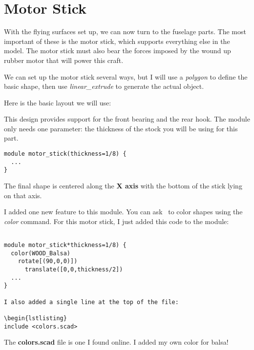 \section*{Motor Stick}

With the flying surfaces set up, we can now turn to the fuselage parts. The
most important of these is the motor stick, which supports everything else in
the model. The motor stick must also bear the forces imposed by the wound up
rubber motor that will power this craft.

We can set up the motor stick several ways, but I will use a {\it polygon} to
define the basic shape, then use {\it linear\_extrude} to generate the actual
object.

Here is the basic layout we will use:


This design provides support for the front bearing and the rear hook. The
module only needs one parameter: the thickness of the stock you will be using
for this part.

\begin{lstlisting}
module motor_stick(thickness=1/8) {
  ...
}
\end{lstlisting}

The final shape is centered along the {\bf X axis} with the bottom of the stick
lying on that axis.


I added one new feature to this module. You can ask \osc\ to color shapes using
the {\it color} command. For this motor stick, I just added this code to the
module:

\begin{lstlisting}

module motor_stick*thickness=1/8) {
  color(WOOD_Balsa)
    rotate[(90,0,0)])
      translate([0,0,thickness/2])
  ...
}

I also added a single line at the top of the file:

\begin{lstlisting}
include <colors.scad>
\end{lstlisting}

The {\bf colors.scad} file is one I found online. I added my own color for balsa!

